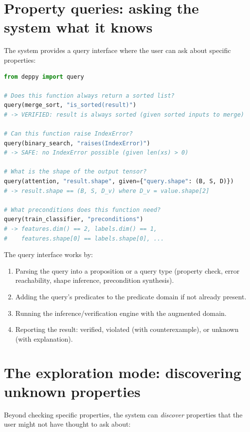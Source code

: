 \documentclass[11pt]{report}
\theoremstyle{definition}
\theoremstyle{plain}
\begin{document}
\section{Property queries: asking the system what it knows}

The system provides a query interface where the user can ask about specific
properties:

\begin{lstlisting}[style=deppy,language=Python]
from deppy import query

# Does this function always return a sorted list?
query(merge_sort, "is_sorted(result)")
# -> VERIFIED: result is always sorted (given sorted inputs to merge)

# Can this function raise IndexError?
query(binary_search, "raises(IndexError)")
# -> SAFE: no IndexError possible (given len(xs) > 0)

# What is the shape of the output tensor?
query(attention, "result.shape", given={"query.shape": (B, S, D)})
# -> result.shape == (B, S, D_v) where D_v = value.shape[2]

# What preconditions does this function need?
query(train_classifier, "preconditions")
# -> features.dim() == 2, labels.dim() == 1,
#    features.shape[0] == labels.shape[0], ...
\end{lstlisting}

The query interface works by:
\begin{enumerate}[nosep]
  \item Parsing the query into a proposition or a query type (property check,
        error reachability, shape inference, precondition synthesis).
  \item Adding the query's predicates to the predicate domain if not already
        present.
  \item Running the inference/verification engine with the augmented domain.
  \item Reporting the result: verified, violated (with counterexample), or
        unknown (with explanation).
\end{enumerate}

\section{The exploration mode: discovering unknown properties}

Beyond checking specific properties, the system can \emph{discover} properties
that the user might not have thought to ask about:
\end{document}
